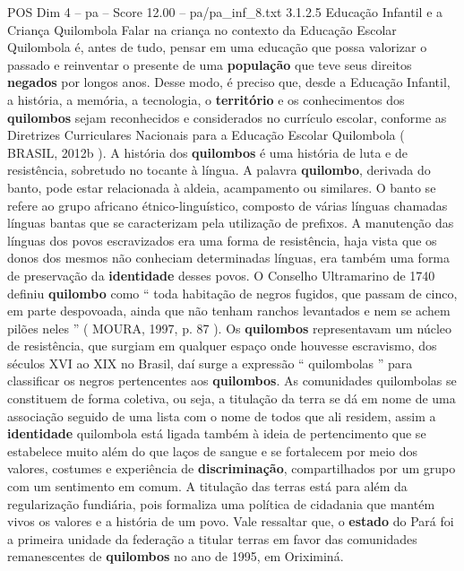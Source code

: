 \begin{textsample}{POS Dim 4 – pa – Score 12.00 – pa/pa\_inf\_8.txt}  \label{ex:f4_pos_015}
3.1.2.5 Educação Infantil e a Criança Quilombola Falar na criança no contexto da Educação Escolar Quilombola é, antes de tudo, pensar em uma educação que possa valorizar o passado e reinventar o presente de uma \textbf{população} que teve seus direitos \textbf{negados} por longos anos.
Desse modo, é preciso que, desde a Educação Infantil, a história, a memória, a tecnologia, o \textbf{território} e os conhecimentos dos \textbf{quilombos} sejam reconhecidos e considerados no currículo escolar, conforme as Diretrizes Curriculares Nacionais para a Educação Escolar Quilombola ( BRASIL, 2012b ).
A história dos \textbf{quilombos} é uma história de luta e de resistência, sobretudo no tocante à língua.
A palavra \textbf{quilombo}, derivada do banto, pode estar relacionada à aldeia, acampamento ou similares.
O banto se refere ao grupo africano étnico-linguístico, composto de várias línguas chamadas línguas bantas que se caracterizam pela utilização de prefixos.
A manutenção das línguas dos povos escravizados era uma forma de resistência, haja vista que os donos dos mesmos não conheciam determinadas línguas, era também uma forma de preservação da \textbf{identidade} desses povos.
O Conselho Ultramarino de 1740 definiu \textbf{quilombo} como “ toda habitação de negros fugidos, que passam de cinco, em parte despovoada, ainda que não tenham ranchos levantados e nem se achem pilões neles ” ( MOURA, 1997, p. 87 ).
Os \textbf{quilombos} representavam um núcleo de resistência, que surgiam em qualquer espaço onde houvesse escravismo, dos séculos XVI ao XIX no Brasil, daí surge a expressão “ quilombolas ” para classificar os negros pertencentes aos \textbf{quilombos}.
As comunidades quilombolas se constituem de forma coletiva, ou seja, a titulação da terra se dá em nome de uma associação seguido de uma lista com o nome de todos que ali residem, assim a \textbf{identidade} quilombola está ligada também à ideia de pertencimento que se estabelece muito além do que laços de sangue e se fortalecem por meio dos valores, costumes e experiência de \textbf{discriminação}, compartilhados por um grupo com um sentimento em comum.
A titulação das terras está para além da regularização fundiária, pois formaliza uma política de cidadania que mantém vivos os valores e a história de um povo.
Vale ressaltar que, o \textbf{estado} do Pará foi a primeira unidade da federação a titular terras em favor das comunidades remanescentes de \textbf{quilombos} no ano de 1995, em Oriximiná.

\end{textsample}
